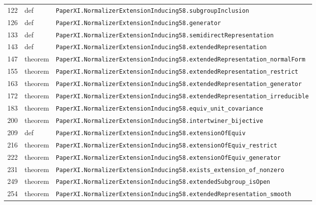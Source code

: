 \documentclass[10pt,oneside]{book}
\begin{document}
\begin{longtable}{@{}p{}p{}p{}@{}}
122&def&\nolinkurl{PaperXI.NormalizerExtensionInducing58.subgroupInclusion}\\

126&def&\nolinkurl{PaperXI.NormalizerExtensionInducing58.generator}\\

133&def&\nolinkurl{PaperXI.NormalizerExtensionInducing58.semidirectRepresentation}\\

143&def&\nolinkurl{PaperXI.NormalizerExtensionInducing58.extendedRepresentation}\\

147&theorem&\nolinkurl{PaperXI.NormalizerExtensionInducing58.extendedRepresentation_normalForm}\\

155&theorem&\nolinkurl{PaperXI.NormalizerExtensionInducing58.extendedRepresentation_restrict}\\

163&theorem&\nolinkurl{PaperXI.NormalizerExtensionInducing58.extendedRepresentation_generator}\\

172&theorem&\nolinkurl{PaperXI.NormalizerExtensionInducing58.extendedRepresentation_irreducible}\\

183&theorem&\nolinkurl{PaperXI.NormalizerExtensionInducing58.equiv_unit_covariance}\\

200&theorem&\nolinkurl{PaperXI.NormalizerExtensionInducing58.intertwiner_bijective}\\

209&def&\nolinkurl{PaperXI.NormalizerExtensionInducing58.extensionOfEquiv}\\

216&theorem&\nolinkurl{PaperXI.NormalizerExtensionInducing58.extensionOfEquiv_restrict}\\

222&theorem&\nolinkurl{PaperXI.NormalizerExtensionInducing58.extensionOfEquiv_generator}\\

231&theorem&\nolinkurl{PaperXI.NormalizerExtensionInducing58.exists_extension_of_nonzero}\\

249&theorem&\nolinkurl{PaperXI.NormalizerExtensionInducing58.extendedSubgroup_isOpen}\\

254&theorem&\nolinkurl{PaperXI.NormalizerExtensionInducing58.extendedRepresentation_smooth}\\

\bottomrule\end{longtable}
\end{document}
